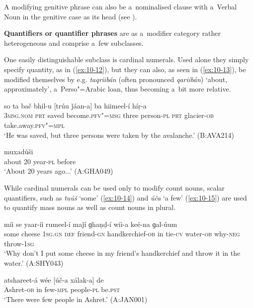 A modifying genitive phrase can also be a~nominalised clause with a~Verbal Noun in the genitive case as its head (see ).


\textbf{Quantifiers or quantifier phrases} are as a~modifier category rather heterogeneous and comprise a~few subclasses.  


One easily distinguishable subclass is cardinal numerals. Used alone they simply specify quantity, as in (\ref{ex:10-12}), but they can also, as seen in (\ref{ex:10-13}), be modified themselves by e.g. \textit{taqriibán} (often pronounced \textit{qariibán}) `about, approximately', a~Perso"=Arabic loan, thus becoming a~bit more relative.

\begin{exe}
\ex
\label{ex:10-12}
\gll so ta bač bhil-u [trúu ǰáan-a] ba hiimeel-í híṛ-a  \\
\textsc{3msg.nom} \textsc{prt} saved become.\textsc{pfv"=msg} three  person-\textsc{pl} \textsc{prt} glacier-\textsc{ob} take.away.\textsc{pfv"=mpl} \\
\glt `He was saved, but three persons were taken by the avalanche.' (B:AVA214)

\ex
\label{ex:10-13}
 muxadúši  \\
about 20 year-\textsc{pl} before \\
\glt `About 20 years ago...' (A:GHA049)
\end{exe}

While cardinal numerals can be used only to modify count nouns, scalar quantifiers, such as \textit{tuúš} `some' (\ref{ex:10-14}) and \textit{úča} `a few' (\ref{ex:10-15}) are used to quantify mass nouns as well as count nouns in plural. 

\begin{exe}
\ex
\label{ex:10-14}
 míi se yaar-íi rumeel-í maǰí ɡhaṇḍ-í wíi-a keé-na ɡal-úum \\
some cheese \textsc{1sg.gn} \textsc{def} friend-\textsc{gn} handkerchief-\textsc{ob}  in tie-\textsc{cv} water-\textsc{ob} why-\textsc{neg} throw-\textsc{1sg} \\
\glt `Why don't I put some cheese in my friend's handkerchief and throw it in the water.' (A:SHY043)

\ex
\label{ex:10-15}
\gll atshareet-á wée [úč-a xálak-a] de \\
Ashret-\textsc{ob} in few-\textsc{mpl} people-\textsc{pl} be.\textsc{pst} \\
\glt `There were few people in Ashret.' (A:JAN001)
\end{exe}

